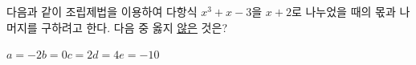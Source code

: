 다음과 같이 조립제법을 이용하여 다항식 $x^3+x-3$을 $x+2$로 나누었을 때의 몫과 나머지를 구하려고 한다. 다음 중 옳지 \underline{않은} 것은?\par{}\par\smallskip\noindent
\begin{choices32}{$a=-2$}{$b=0$}{$c=2$}{$d=4$}{$e=-10$}\end{choices32}
